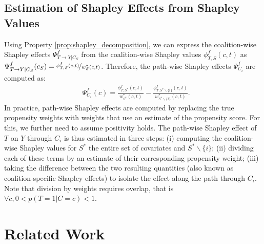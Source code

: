 \documentclass{article}
\theoremstyle{plain}
\theoremstyle{definition}
\theoremstyle{remark}
\newcommand{\effect}{\Psi}
\theoremstyle{mystyle}
\newcommand{\coalitionshapley}[4]{\phi^{#1}_{#3,#2}(#4)}
\begin{document}
\subsection{Estimation of Shapley Effects from Shapley Values}
\label{sec:estimation_procedure}
Using Property \ref{prop:shapley_decomposition}, we can express the coalition-wise Shapley effects $\effect^f_{ T \rightarrow Y | C_{S}}$ from the coalition-wise Shapley values $\coalitionshapley{f}{S}{T}{c,t}$ as
$\effect^f_{ T \rightarrow Y | C_{S}}(c_S) = \nicefrac{\coalitionshapley{f}{S}{T}{c,t}}{w^*_S(c,t)}$.
Therefore, the path-wise Shapley effects $\effect^f_{C_i}$ are computed as:
\begin{align*}
&\effect^f_{C_i}(c) = \frac{\coalitionshapley{f}{S^*}{T}{c,t}}{w^*_{S^*}(c,t)} - \frac{\coalitionshapley{f}{S^* \backslash \{i\}}{T}{c,t}}{w^*_{S^* \backslash \{i\}}(c,t)}.
\end{align*}
In practice, path-wise Shapley effects are computed by replacing the true propensity weights with weights that use an estimate of the propensity score. For this, we further need to assume positivity holds. The path-wise Shapley effect of $T$ on $Y$ through $C_i$ is thus estimated in three steps: (i) computing the coalition-wise Shapley values for $S^*$ the entire set of covariates and $S^* \backslash \{i\}$; (ii) dividing each of these terms by an estimate of their corresponding propensity weight; (iii) taking the difference between the two resulting quantities (also known as coalition-specific Shapley effects) to isolate the effect along the path through $C_i$. Note that division by weights requires overlap, that is $\forall c, 0 < p(T=1|C=c) < 1$.




\section{Related Work}
\end{document}
